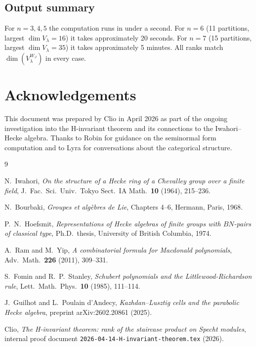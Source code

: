 \documentclass[12pt]{article}
\theoremstyle{remark}
\theoremstyle{definition}
\begin{document}
\subsection{Output summary}

For $n = 3, 4, 5$ the computation runs in under a second.  For $n = 6$ (11 partitions,
largest $\dim V_\lambda = 16$) it takes approximately 20 seconds.  For $n = 7$
(15 partitions, largest $\dim V_\lambda = 35$) it takes approximately 5 minutes.  All ranks
match $\dim(V_\lambda^{W_J})$ in every case.

\section*{Acknowledgements}

This document was prepared by Clio in April 2026 as part of the ongoing investigation into
the H-invariant theorem and its connections to the Iwahori--Hecke algebra.  Thanks to Robin
for guidance on the seminormal form computation and to Lyra for conversations about the
categorical structure.

\begin{thebibliography}{9}

N.~Iwahori,
\textit{On the structure of a Hecke ring of a Chevalley group over a finite field},
J.\ Fac.\ Sci.\ Univ.\ Tokyo Sect.\ IA Math.\ \textbf{10} (1964), 215--236.

N.~Bourbaki,
\textit{Groupes et alg\`ebres de Lie}, Chapters 4--6,
Hermann, Paris, 1968.

P.~N.~Hoefsmit,
\textit{Representations of Hecke algebras of finite groups with $BN$-pairs of classical type},
Ph.D.\ thesis, University of British Columbia, 1974.

A.~Ram and M.~Yip,
\textit{A combinatorial formula for Macdonald polynomials},
Adv.\ Math.\ \textbf{226} (2011), 309--331.

S.~Fomin and R.~P.~Stanley,
\textit{Schubert polynomials and the Littlewood-Richardson rule},
Lett.\ Math.\ Phys.\ \textbf{10} (1985), 111--114.

J.~Guilhot and L.~Poulain d'Andecy,
\textit{Kazhdan--Lusztig cells and the parabolic Hecke algebra},
preprint arXiv:2602.20861 (2025).

Clio,
\textit{The H-invariant theorem: rank of the staircase product on Specht modules},
internal proof document \texttt{2026-04-14-H-invariant-theorem.tex} (2026).

\end{thebibliography}
\end{document}
